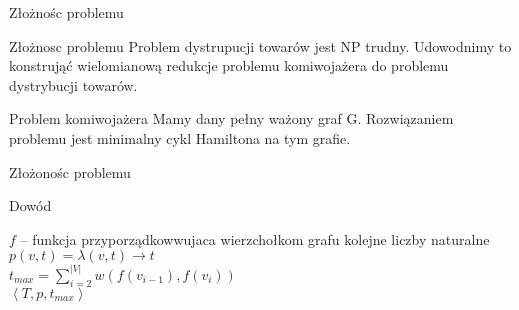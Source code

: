\begin{frame}{Złożnośc problemu}
	\begin{block}{Złożnosc problemu}
		Problem dystrupucji towarów jest NP trudny.
		Udowodnimy to konstrująć wielomianową redukcje problemu komiwojażera do problemu dystrybucji towarów.
	\end{block}

	\begin{block}{Problem komiwojażera}
		Mamy dany pełny ważony graf G. Rozwiązaniem problemu jest minimalny cykl Hamiltona na tym grafie.
	\end{block}
\end{frame}

\begin{frame}{Złożonośc problemu}
	\begin{block}{Dowód}
		
		\begin{algorithm}[H]
			$f$ -- funkcja przyporządkowwujaca wierzchołkom grafu kolejne liczby naturalne \\
			$p(v, t) = \lambda\left( v, t \right) \rightarrow t$ \\
			$t_{max} = \sum\limits_{i=2}^{|V|} w(f(v_{i-1}), f(v_i))$ \\
			\Return $\left< T, p , t_{max} \right> $
		\end{algorithm}
	
	\end{block}

\end{frame}
